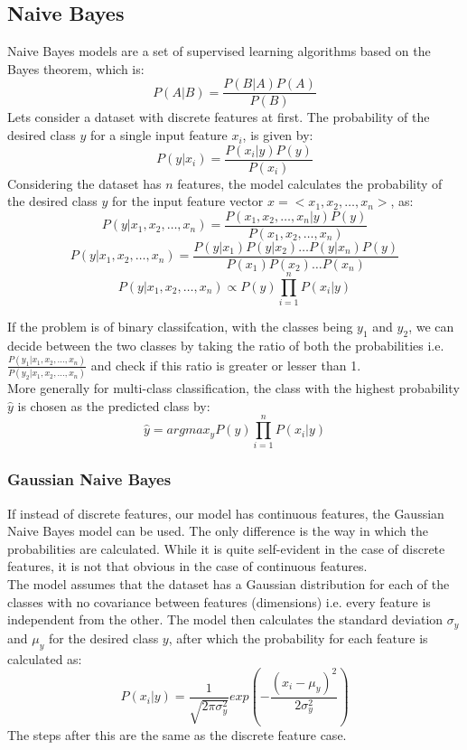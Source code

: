\documentclass{article}
\begin{document}
\subsection{Naive Bayes}
Naive Bayes models are a set of supervised learning algorithms based on the Bayes theorem, which is:
\begin{equation}
    P(A|B) = \frac{P(B|A)P(A)}{P(B)}
\end{equation}
Lets consider a dataset with discrete features at first. The probability of the desired class $y$ for a single input feature $x_i$, is given by:
\begin{equation}
    P(y|x_i) = \frac{P(x_i|y)P(y)}{P(x_i)}
\end{equation}
Considering the dataset has $n$ features, the model calculates the probability of the desired class $y$ for the input feature vector $x = <x_1,x_2,\dots,x_n>$, as:
\begin{equation*}
    P(y|x_1,x_2,\dots,x_n) = \frac{P(x_1,x_2,\dots,x_n|y)P(y)}{P(x_1,x_2,\dots,x_n)}
\end{equation*}
\begin{equation*}
    P(y|x_1,x_2,\dots,x_n) = \frac{P(y|x_1)P(y|x_2)\dots P(y|x_n)P(y)}{P(x_1)P(x_2)\dots P(x_n)}
\end{equation*}
\begin{equation}
    P(y|x_1,x_2,\dots,x_n) \propto P(y) \prod_{i=1}^{n} P(x_i|y)
\end{equation}

If the problem is of binary classifcation, with the classes being $y_1$ and $y_2$, we can decide between the two classes by taking the ratio of both the probabilities i.e. $\frac{P(y_1|x_1,x_2,\dots,x_n)}{P(y_2|x_1,x_2,\dots,x_n)}$ and check if this ratio is greater or lesser than 1.\\
More generally for multi-class classification, the class with the highest probability $\hat{y}$ is chosen as the predicted class by: 
\begin{equation}
    \hat{y} = argmax_y P(y) \prod_{i=1}^{n} P(x_i|y)
\end{equation}
\subsubsection*{Gaussian Naive Bayes}
If instead of discrete features, our model has continuous features, the Gaussian Naive Bayes model can be used. The only difference is the way in which the probabilities are calculated. While it is quite self-evident in the case of discrete features, it is not that obvious in the case of continuous features.\\
The model assumes that the dataset has a Gaussian distribution for each of the classes with no covariance between features (dimensions) i.e. every feature is independent from the other. The model then calculates the standard deviation $\sigma_y$ and $\mu_y$ for the desired class $y$, after which the probability for each feature is calculated as:
\begin{equation}
    P(x_i|y) = \frac{1}{\sqrt{2\pi\sigma_y^2}} exp \left (-\frac{(x_i-\mu_y)^2}{2\sigma_y^2}\right)
\end{equation}
The steps after this are the same as the discrete feature case.
 
\end{document}
